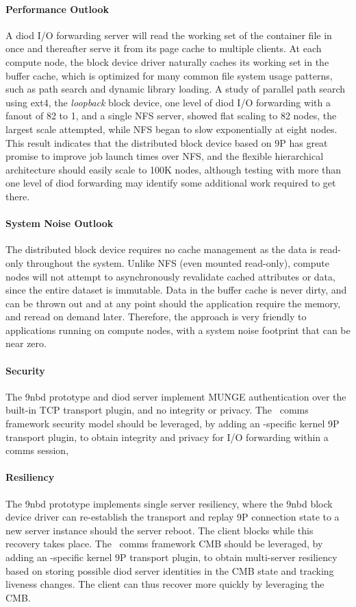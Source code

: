 \paragraph{Performance Outlook}
A diod I/O forwarding server will read the working set of the container
file in once and thereafter serve it from its page cache to multiple clients.
At each compute node,
the block device driver naturally caches its working set in the buffer cache,
which is optimized for many common file system usage patterns,
such as path search and dynamic library loading.
A study of parallel path search\cite{BlkDevPathSearch}
using ext4, the {\em loopback} block device, one level of diod I/O forwarding
with a fanout of 82 to 1, and a single NFS server,
showed flat scaling to 82 nodes, the largest scale attempted,
while NFS began to slow exponentially at eight nodes.
This result indicates that the distributed block device based on 9P has
great promise to improve job launch times over NFS, and the flexible
hierarchical architecture should easily scale to 100K nodes, although
testing with more than one level of diod forwarding may identify some
additional work required to get there.

\paragraph{System Noise Outlook}
The distributed block device requires no cache management as the
data is read-only throughout the system.  Unlike NFS (even mounted read-only),
compute nodes will not attempt to asynchronously revalidate cached
attributes or data, since the entire dataset is immutable.
Data in the buffer cache is never dirty, and can be thrown out and at
any point should the application require the memory, and reread on demand later.
Therefore, the approach is very friendly to applications running on compute
nodes, with a system noise footprint that can be near zero.

\paragraph{Security}
The 9nbd prototype and diod server implement MUNGE authentication
over the built-in TCP transport plugin, and no integrity or privacy.
The \ngrm\ comms framework security model should be leveraged,
by adding an \ngrm-specific kernel 9P transport plugin,
to obtain integrity and privacy for I/O forwarding within a comms session,

\paragraph{Resiliency}
The 9nbd prototype implements single server resiliency, where the
9nbd block device driver can re-establish the transport and replay
9P connection state to a new server instance should the server reboot.
The client blocks while this recovery takes place.
The \ngrm\ comms framework CMB should be leveraged,
by adding an \ngrm-specific kernel 9P transport plugin,
to obtain multi-server resiliency based on storing possible diod server
identities in the CMB state and tracking liveness changes.
The client can thus recover more quickly by leveraging the CMB.

